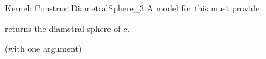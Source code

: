 \begin{ccRefFunctionObjectConcept}{Kernel::ConstructDiametralSphere_3}
A model for this must provide:


       {returns the diametral sphere of $c$.}

\ccRefines
{} (with one argument)

\ccSeeAlso
{}

\end{ccRefFunctionObjectConcept}
